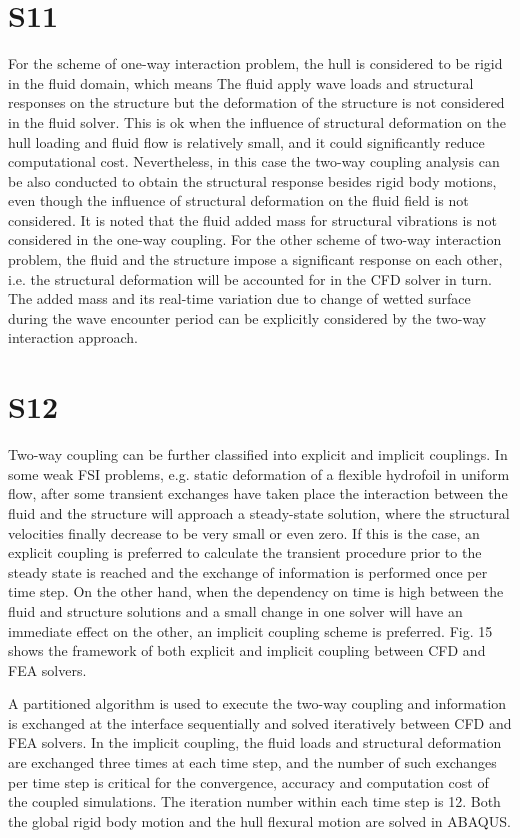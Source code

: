 \documentclass[17pt]{extarticle} %
\begin{document}
\section*{S11}
For the scheme of one-way interaction problem, the hull is considered to be rigid in the fluid domain, which means The fluid apply wave loads and structural responses 
on the structure but the deformation of the structure is not considered in the fluid solver. This is ok when the influence of structural 
deformation on the hull loading and fluid flow is relatively small, and it could significantly reduce computational cost. Nevertheless, in this case the 
two-way coupling analysis can be also conducted to obtain the structural response besides rigid body motions, even though the influence of structural 
deformation on the fluid field is not considered. It is noted that the fluid added mass for structural vibrations is not considered in the one-way coupling. 
For the other scheme of two-way interaction problem, the fluid and the structure impose a significant response on each other, i.e. the structural deformation 
will be accounted for in the CFD solver in turn. The added mass and its real-time variation due to change of wetted surface during the wave encounter period 
can be explicitly considered by the two-way interaction approach.

\section*{S12}
Two-way coupling can be further classified into explicit and implicit couplings. In some weak FSI problems, e.g. 
static deformation of a flexible hydrofoil in uniform flow, after some transient exchanges have taken place the 
interaction between the fluid and the structure will approach a steady-state solution, where the structural velocities
finally decrease to be very small or even zero. If this is the case, an explicit coupling is preferred to calculate the 
transient procedure prior to the steady state is reached and the exchange of information is performed once per time step. 
On the other hand, when the dependency on time is high between the fluid and structure solutions and a small change 
in one solver will have an immediate effect on the other, an implicit coupling scheme is preferred. Fig. 15 shows the framework of 
both explicit and implicit coupling between CFD and FEA solvers.

A partitioned algorithm is used to execute the two-way coupling and information is exchanged at the interface sequentially and 
solved iteratively between CFD and FEA solvers. In the implicit coupling, the fluid loads and structural deformation are exchanged 
three times at each time step, and the number of such exchanges per time step is critical for the convergence, accuracy and computation 
cost of the coupled simulations. The iteration number within each time step is 12. Both the global rigid body motion and the hull flexural 
motion are solved in ABAQUS.
\end{document}

